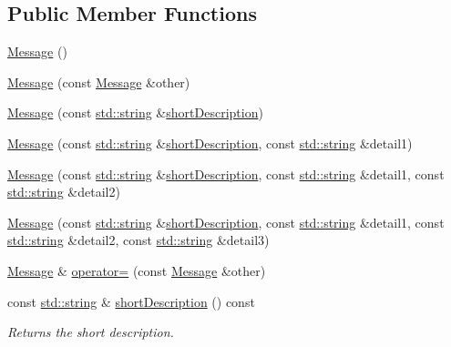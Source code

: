 \subsection*{Public Member Functions}
\begin{DoxyCompactItemize}
\item 
\hyperlink{class_message_a4fc4f717b634e66070366cb7722d7761}{Message} ()
\item 
\hyperlink{class_message_ad253b20930e70257e2523bb9fc7d299c}{Message} (const \hyperlink{class_message}{Message} \&other)
\item 
\hyperlink{class_message_aad17a05b7c2d5f1ef207f7150691a03a}{Message} (const \hyperlink{glew_8h_ae84541b4f3d8e1ea24ec0f466a8c568b}{std\-::string} \&\hyperlink{class_message_aa22497c35079e8619c516f693d1fd97f}{short\-Description})
\item 
\hyperlink{class_message_ab77d28861db855dadef024529aab07d8}{Message} (const \hyperlink{glew_8h_ae84541b4f3d8e1ea24ec0f466a8c568b}{std\-::string} \&\hyperlink{class_message_aa22497c35079e8619c516f693d1fd97f}{short\-Description}, const \hyperlink{glew_8h_ae84541b4f3d8e1ea24ec0f466a8c568b}{std\-::string} \&detail1)
\item 
\hyperlink{class_message_ae8c66f7de0811d86765369a4c430bb6c}{Message} (const \hyperlink{glew_8h_ae84541b4f3d8e1ea24ec0f466a8c568b}{std\-::string} \&\hyperlink{class_message_aa22497c35079e8619c516f693d1fd97f}{short\-Description}, const \hyperlink{glew_8h_ae84541b4f3d8e1ea24ec0f466a8c568b}{std\-::string} \&detail1, const \hyperlink{glew_8h_ae84541b4f3d8e1ea24ec0f466a8c568b}{std\-::string} \&detail2)
\item 
\hyperlink{class_message_a65fcd0b70c65cf7b9b9de390386cef79}{Message} (const \hyperlink{glew_8h_ae84541b4f3d8e1ea24ec0f466a8c568b}{std\-::string} \&\hyperlink{class_message_aa22497c35079e8619c516f693d1fd97f}{short\-Description}, const \hyperlink{glew_8h_ae84541b4f3d8e1ea24ec0f466a8c568b}{std\-::string} \&detail1, const \hyperlink{glew_8h_ae84541b4f3d8e1ea24ec0f466a8c568b}{std\-::string} \&detail2, const \hyperlink{glew_8h_ae84541b4f3d8e1ea24ec0f466a8c568b}{std\-::string} \&detail3)
\item 
\hyperlink{class_message}{Message} \& \hyperlink{class_message_a8003315e3355d1b0a5e3b7dcd5a0514c}{operator=} (const \hyperlink{class_message}{Message} \&other)
\item 
const \hyperlink{glew_8h_ae84541b4f3d8e1ea24ec0f466a8c568b}{std\-::string} \& \hyperlink{class_message_aa22497c35079e8619c516f693d1fd97f}{short\-Description} () const 
\begin{DoxyCompactList}\small\item\em Returns the short description. \end{DoxyCompactList}\item 

\end{DoxyCompactItemize}
